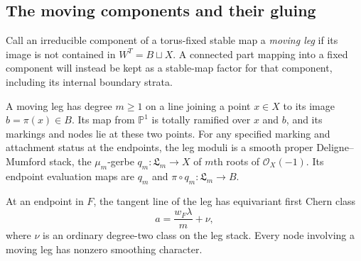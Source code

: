 \subsection{The moving components and their gluing}

Call an irreducible component of a torus-fixed stable map a
\emph{moving leg} if its image is not contained in $W^T=B\sqcup X$.
A connected part mapping into a fixed component will instead be kept as
a stable-map factor for that component, including its internal boundary
strata.

\begin{lemma}\label{loc:leg-geometry}
A moving leg has degree $m\geq1$ on a line joining a point
$x\in X$ to its image $b=\pi(x)\in B$. Its map from $\mathbb P^1$ is
totally ramified over $x$ and $b$, and its markings and nodes lie at these
two points. For any specified marking and attachment status at the
endpoints, the leg moduli is a smooth proper Deligne--Mumford stack,
the $\mu_m$-gerbe $q_m:\mathfrak L_m\to X$ of $m$th roots of
$\mathcal O_X(-1)$. Its endpoint evaluation maps are $q_m$ and
$\pi\circ q_m:\mathfrak L_m\to B$.

At an endpoint in $F$, the tangent line of the leg has equivariant
first Chern class
\[
        a=\frac{w_F\lambda}{m}+\nu,
\]
where $\nu$ is an ordinary degree-two class on the leg stack.
Every node involving a moving leg has nonzero smoothing character.
\end{lemma}

